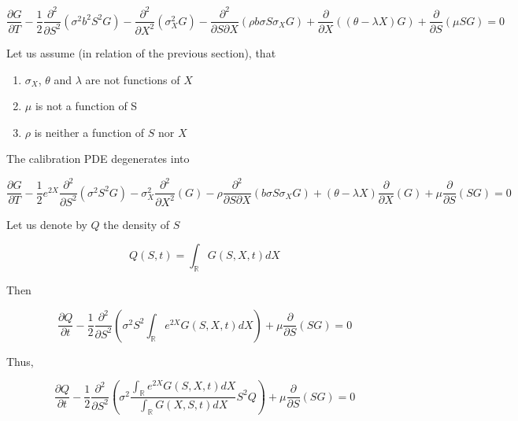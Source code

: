 \documentclass{article}
\begin{document}
\begin{equation}
	\frac{\partial G}{\partial T} 
- \frac{1}{2} \frac{\partial^2}{\partial S^2} \left(\sigma^2 b^2 S^2 G\right) 
- \frac{\partial^2}{\partial X^2} \left( \sigma_X^2 G\right) 
- \frac{\partial^2}{\partial S \partial X} \left(\rho b \sigma S \sigma_X G \right) 
+ \frac{\partial }{\partial X}\left( (\theta - \lambda X) G\right) 
+ \frac{\partial }{\partial S}(\mu S G)
 = 0
\end{equation}

\noindent Let us assume (in relation of the previous section), that 
\begin{enumerate}
	\item $\sigma_X$, $\theta$ and $\lambda$ are not functions of $X$
	\item $\mu$ is not a function of S
	\item $\rho$ is neither a function of $S$ nor $X$
\end{enumerate}

\noindent The calibration PDE degenerates into 

\begin{equation}
	\frac{\partial G}{\partial T} 
- \frac{1}{2} e^{2X }\frac{\partial^2}{\partial S^2} \left(\sigma^2 S^2 G\right) 
- \sigma_X^2 \frac{\partial^2}{\partial X^2} \left( G\right) 
- \rho \frac{\partial^2}{\partial S \partial X} \left(b \sigma S \sigma_X G \right) 
+ \left(\theta - \lambda X\right) \frac{\partial }{\partial X}\left( G\right) 
+ \mu \frac{\partial }{\partial S}(S G)
 = 0
\end{equation}

\noindent Let us denote by $Q$ the density of $S$

\begin{equation}
	Q(S,t) = \int_\mathbb{R} G(S,X,t) dX
\end{equation}

\noindent Then

\begin{equation}
	\frac{\partial Q}{\partial t} - \frac{1}{2} \frac{\partial^2}{\partial S^2} \left(\sigma^2 S^2 \int_\mathbb{R} e^{2X} G(S,X,t) dX \right) + \mu \frac{\partial }{\partial S}(S G) = 0
\end{equation}

\noindent Thus,

\begin{equation}
	\frac{\partial Q}{\partial t} - \frac{1}{2} \frac{\partial^2}{\partial S^2} \left(\sigma^2  \frac{\int_\mathbb{R} e^{2X} G(S,X,t) dX}{\int_\mathbb{R} G(X,S,t) dX}S^2Q\right) + \mu \frac{\partial }{\partial S}(S G) = 0
\end{equation}
\end{document}
